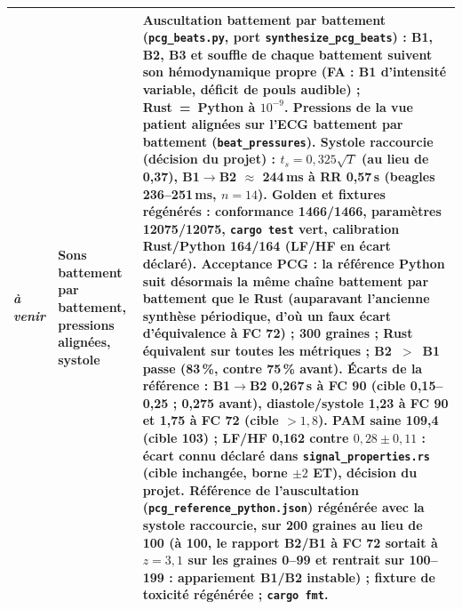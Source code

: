 \documentclass[11pt,a4paper]{article}
\newcommand{\ecart}[1]{\textcolor{red!60!black}{#1}}
\begin{document}
\begin{longtable}{@{}p{1.5cm}p{4.2cm}p{10.3cm}@{}}
\textit{à venir} & Sons battement par battement, pressions alignées, systole & Auscultation battement par battement (\texttt{pcg\_beats.py}, port \texttt{synthesize\_pcg\_beats}) : B1, B2, B3 et souffle de chaque battement suivent son hémodynamique propre (FA : B1 d'intensité variable, déficit de pouls audible) ; Rust~=~Python à $10^{-9}$. Pressions de la vue patient alignées sur l'ECG battement par battement (\texttt{beat\_pressures}). Systole raccourcie (décision du projet) : $t_s = 0{,}325\sqrt{T}$ (au lieu de 0,37), B1$\to$B2 $\approx$ 244\,ms à RR 0,57\,s (beagles 236--251\,ms, $n=14$). Golden et fixtures régénérés : conformance 1466/1466, paramètres 12075/12075, \texttt{cargo test} vert, calibration Rust/Python 164/164 (LF/HF en écart déclaré). Acceptance PCG : la référence Python suit désormais la même chaîne battement par battement que le Rust (auparavant l'ancienne synthèse périodique, d'où un faux écart d'équivalence à FC 72) ; 300 graines ; Rust équivalent sur toutes les métriques ; B2~$>$~B1 passe (83\,\%, contre 75\,\% avant). \ecart{Écarts de la référence : B1$\to$B2 0,267\,s à FC 90 (cible 0,15--0,25 ; 0,275 avant), diastole/systole 1,23 à FC 90 et 1,75 à FC 72 (cible $>1{,}8$).} \ecart{PAM saine 109,4 (cible 103) ; LF/HF 0,162 contre $0{,}28\pm0{,}11$ \citep{bogucki2015} : écart connu déclaré dans \texttt{signal\_properties.rs} (cible inchangée, borne $\pm2$ ET), décision du projet.} Référence de l'auscultation (\texttt{pcg\_reference\_python.json}) régénérée avec la systole raccourcie, sur 200 graines au lieu de 100 (à 100, le rapport B2/B1 à FC 72 sortait à $z=3{,}1$ sur les graines 0--99 et rentrait sur 100--199 : appariement B1/B2 instable) ; fixture de toxicité régénérée ; \texttt{cargo fmt}.\\
\bottomrule
\end{longtable}
\end{document}
